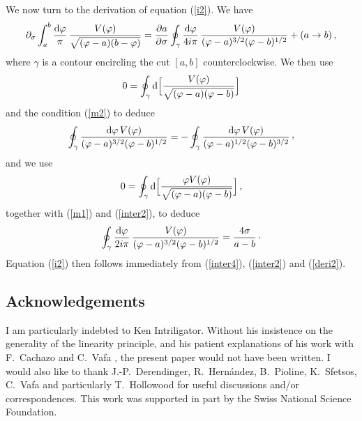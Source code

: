 \documentclass[a4paper,12pt]{article}
\def\cvp{\raise 2pt\hbox{,}}
\def\d{{\rm d}}
\begin{document}
\begin{appendix}
We now turn to the derivation of equation (\ref{i2}). We have
%
\begin{equation}
\label{deri2}
\partial_{\sigma}\int_{a}^{b} {\d\varphi\over\pi}\, 
{ V(\varphi)\over\sqrt{(\varphi -a)(b-\varphi)}} =
{\partial a\over\partial\sigma}\oint_{\gamma} {\d\varphi\over 
4i\pi}\, {V(\varphi)\over (\varphi-a)^{3/2} (\varphi -b)^{1/2}} + 
(a\rightarrow b)\, ,
\end{equation}
%
where $\gamma$ is a contour encircling the cut $[a,b]$ 
counterclockwise. We then use
%
\begin{equation}
\label{inter1}
0 =\oint_{\gamma} \d\Bigl[ 
{ V(\varphi)\over\sqrt{(\varphi -a)(\varphi -b)}}\Bigr]
\end{equation}
%
and the condition (\ref{m2}) to deduce
%
\begin{equation}
\label{inter2}
\oint_{\gamma} {\d\varphi\, V(\varphi)\over (\varphi -a)^{3/2} 
(\varphi -b)^{1/2}} = - \oint_{\gamma} {\d\varphi\,
V(\varphi)\over (\varphi -a)^{1/2} (\varphi -b)^{3/2}}\,\cvp
\end{equation}
%
and we use
%
\begin{equation}
\label{inter3}
0 =\oint_{\gamma} \d\Bigl[ 
{\varphi V(\varphi)\over\sqrt{(\varphi -a)(\varphi -b)}}\Bigr]\, ,
\end{equation}
%
together with (\ref{m1}) and (\ref{inter2}), to deduce
%
\begin{equation}
\label{inter4}
\oint_{\gamma} {\d\varphi\over 2i\pi}\, 
{V(\varphi)\over (\varphi -a)^{3/2} 
(\varphi -b)^{1/2}} = {4\sigma\over a-b}\,\cdotp
\end{equation}
%
Equation (\ref{i2}) then follows immediately from (\ref{inter4}), 
(\ref{inter2}) and (\ref{deri2}).

%
\end{appendix}
%

\subsection*{Acknowledgements}

I am particularly indebted to Ken Intriligator. Without his insistence
on the generality of the linearity principle, and his patient
explanations of his work with F.~Cachazo and C.~Vafa \cite{CIV}, the
present paper would not have been written. I would also like to thank
J.-P.~Derendinger, R.~Hern\'andez, B.~Pioline, K.~Sfetsos, C.~Vafa and
particularly T.~Hollowood for useful discussions and/or
correspondences. This work was supported in part by the Swiss National
Science Foundation.
\end{document}
